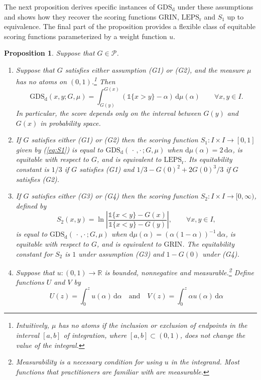 \documentclass[10pt]{article} %
\theoremstyle{theorem}
\newtheorem{prop}{Proposition}
\theoremstyle{definition}
\newcommand{\RRR}{\mathbb{R}}
\newcommand{\dd}{\mathrm{d}}
\newcommand{\one}{\mathds{1}}
\newcommand{\GDSd}{\mathrm{GDS}_\mathrm{d}}
\newcommand{\LEPSr}{\mathrm{LEPS}_\mathrm{r}}
\newcommand{\Grin}{\mathrm{GRIN}}
\newcommand{\twocdots}{\,\cdot\,,\cdot\,}
\begin{document}
The next proposition derives specific instances of $\GDSd$ under these assumptions and shows how they recover the scoring functions $\Grin$, $\LEPSr$ and $S_1$ up to equivalence. The final part of the proposition provides a flexible class of equitable scoring functions parameterized by a weight function $u$.

\begin{prop}\label{prop:real valued equitable scores}
Suppose that $G\in\mathcal{P}$.
\begin{enumerate}
\item[(i)] Suppose that $G$ satisfies either assumption (G1) or (G2), and the measure $\mu$ has no atoms on $(0,1)$.\footnote{Intuitively, $\mu$ has no atoms if the inclusion or exclusion of endpoints in the interval $[a,b]$ of integration, where $[a,b]\subset(0,1)$, does not change the value of the integral.} Then
\begin{equation}\label{eq:GDSd reduced}
\GDSd(x,y;G,\mu) = \int_{G(y)}^{G(x)}(\one\{x>y\} - \alpha)\,\dd\mu(\alpha) \qquad\forall x,y\in I.
\end{equation}
In particular, the score depends only on the interval between $G(y)$ and $G(x)$ in probability space.
\item[(ii)] If $G$ satisfies either (G1) or (G2) then the scoring function $S_1:I \times I\to[0,1]$ given by (\ref{eq:S1}) is equal to $\GDSd(\twocdots;G,\mu)$ when $\dd\mu(\alpha)=2\,\dd\alpha$, is equitable with respect to $G$, and is equivalent to $\LEPSr$. Its equitability constant is $1/3$ if $G$ satisfies (G1) and $1/3-G(0)^2+2G(0)^3/3$ if  $G$ satisfies (G2).
\item[(iii)] If $G$ satisfies either (G3) or (G4) then the scoring function $S_2: I\times I\to[0,\infty)$, defined by
\begin{equation}\label{eq:S2}
S_2(x,y)=\ln\left|\frac{\one\{x < y\} - G(x)}{\one\{x < y\} - G(y)}\right|, \qquad \forall x,y\in I,
\end{equation}
is equal to $\GDSd(\twocdots;G,\mu)$ when $\dd\mu(\alpha) = (\alpha(1-\alpha))^{-1}\,\dd\alpha$, is equitable with respect to $G$, and is equivalent to $\Grin$. The equitability constant for $S_2$ is $1$ under assumption (G3) and $1-G(0)$ under (G4).
\item[(iv)] Suppose that $u:(0,1)\to\RRR$ is bounded, nonnegative and measurable.\footnote{Measurability is a necessary condition for using $u$ in the integrand. Most functions that practitioners are familiar with are measurable.} Define functions $U$ and $V$ by
\[U(z)=\int_0^z u(\alpha)\,\dd\alpha \quad\text{and}\quad V(z)=\int_0^z \alpha u(\alpha)\,\dd\alpha\]

\end{enumerate}
\end{prop}
\end{document}
